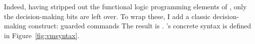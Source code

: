 \documentclass[manuscript,screen,review, 12pt, nonacm]{acmart}
\begin{document}
        
        


        Indeed, having stripped out the functional logic programming elements of
        \VC, only the decision-making bits are left over. To wrap these, I add a
        classic decision-making construct: guarded commands\cite{dijkstra} The result is \VMinus. \VMinus's concrete syntax is
        defined in Figure~\ref{fig:vmsyntax}. 

        
\end{document}
